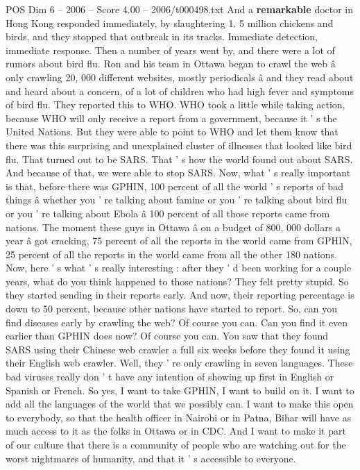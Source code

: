 \begin{textsample}{POS Dim 6 – 2006 – Score 4.00 – 2006/t000498.txt}
And a \textbf{remarkable} doctor in Hong Kong responded immediately, by slaughtering 1. 5 million chickens and birds, and they stopped that outbreak in its tracks.
Immediate detection, immediate response.
Then a number of years went by, and there were a lot of rumors about bird flu.
Ron and his team in Ottawa began to crawl the web â only crawling 20, 000 different websites, mostly periodicals â and they read about and heard about a concern, of a lot of children who had high fever and symptoms of bird flu.
They reported this to WHO.
WHO took a little while taking action, because WHO will only receive a report from a government, because it ' s the United Nations.
But they were able to point to WHO and let them know that there was this surprising and unexplained cluster of illnesses that looked like bird flu.
That turned out to be SARS.
That ' s how the world found out about SARS.
And because of that, we were able to stop SARS.
Now, what ' s really important is that, before there was GPHIN, 100 percent of all the world ' s reports of bad things â whether you ' re talking about famine or you ' re talking about bird flu or you ' re talking about Ebola â 100 percent of all those reports came from nations.
The moment these guys in Ottawa â on a budget of 800, 000 dollars a year â got cracking, 75 percent of all the reports in the world came from GPHIN, 25 percent of all the reports in the world came from all the other 180 nations.
Now, here ' s what ' s really interesting : after they ' d been working for a couple years, what do you think happened to those nations?
They felt pretty stupid.
So they started sending in their reports early.
And now, their reporting percentage is down to 50 percent, because other nations have started to report.
So, can you find diseases early by crawling the web?
Of course you can.
Can you find it even earlier than GPHIN does now?
Of course you can.
You saw that they found SARS using their Chinese web crawler a full six weeks before they found it using their English web crawler.
Well, they ' re only crawling in seven languages.
These bad viruses really don ' t have any intention of showing up first in English or Spanish or French.
So yes, I want to take GPHIN, I want to build on it.
I want to add all the languages of the world that we possibly can.
I want to make this open to everybody, so that the health officer in Nairobi or in Patna, Bihar will have as much access to it as the folks in Ottawa or in CDC.
And I want to make it part of our culture that there is a community of people who are watching out for the worst nightmares of humanity, and that it ' s accessible to everyone.

\end{textsample}

